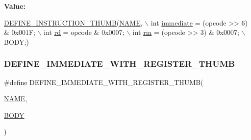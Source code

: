 {\bfseries Value\+:}
\begin{DoxyCode}
\mbox{\hyperlink{isa-thumb_8c_aca0a4c9b536fe9f14f89105945cfeb3d}{DEFINE\_INSTRUCTION\_THUMB}}(\mbox{\hyperlink{inflate_8h_a164ea0159d5f0b5f12a646f25f99eceaa67bc2ced260a8e43805d2480a785d312}{NAME}}, \(\backslash\)
        \textcolor{keywordtype}{int} \mbox{\hyperlink{decoder-arm_8c_a8bc2501cb64b3bc9ac59754cfafb68d1}{immediate}} = (opcode >> 6) & 0x001F; \(\backslash\)
        int \mbox{\hyperlink{isa-arm_8c_a555541ce18ed9b5fad657a06b22cb465}{rd}} = opcode & 0x0007; \(\backslash\)
        int \mbox{\hyperlink{isa-thumb_8c_a20e40d2fb8c51fa4dd2b4449ad32e111}{rm}} = (opcode >> 3) & 0x0007; \(\backslash\)
        BODY;)
\end{DoxyCode}
\mbox{\label{isa-thumb_8c_a27d6bec3e41a99b34e244e6dd3ae7505}} 
\subsubsection{\texorpdfstring{D\+E\+F\+I\+N\+E\+\_\+\+I\+M\+M\+E\+D\+I\+A\+T\+E\+\_\+\+W\+I\+T\+H\+\_\+\+R\+E\+G\+I\+S\+T\+E\+R\+\_\+\+T\+H\+U\+MB}{DEFINE\_IMMEDIATE\_WITH\_REGISTER\_THUMB}}
{\footnotesize\ttfamily \#define D\+E\+F\+I\+N\+E\+\_\+\+I\+M\+M\+E\+D\+I\+A\+T\+E\+\_\+\+W\+I\+T\+H\+\_\+\+R\+E\+G\+I\+S\+T\+E\+R\+\_\+\+T\+H\+U\+MB(\begin{DoxyParamCaption}\item[{}]{\mbox{\hyperlink{inflate_8h_a164ea0159d5f0b5f12a646f25f99eceaa67bc2ced260a8e43805d2480a785d312}{N\+A\+ME}},  }\item[{}]{\mbox{\hyperlink{gzlog_8c_aa6bdf6a6d9916c343e1e17774d84a156}{B\+O\+DY}} }\end{DoxyParamCaption})}

